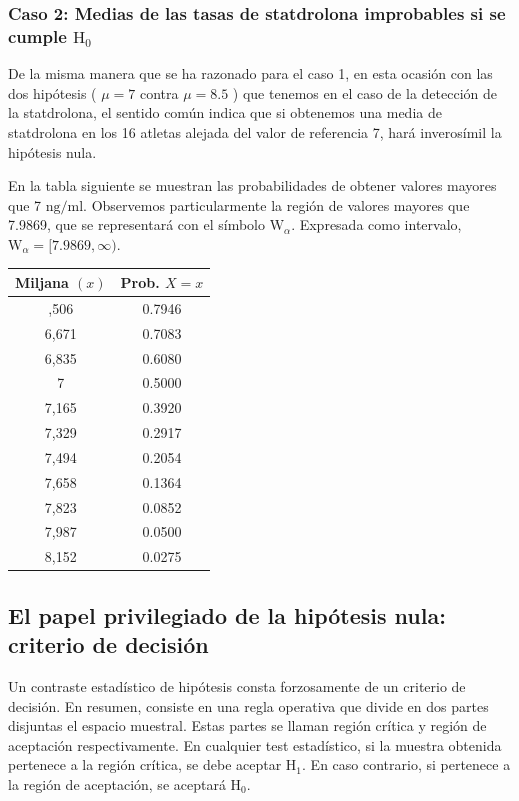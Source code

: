 \documentclass[
]{article}
\begin{document}
\subsubsection{\texorpdfstring{Caso 2: Medias de las tasas de statdrolona improbables si se cumple \(\mathrm{H}_{0}\)}{Caso 2: Medias de las tasas de statdrolona improbables si se cumple \textbackslash mathrm\{H\}\_\{0\}}}\label{caso-2-medias-de-las-tasas-de-statdrolona-improbables-si-se-cumple-mathrmh_0}

De la misma manera que se ha razonado para el caso 1, en esta ocasión con las dos hipótesis ( \(\mu=7\) contra \(\mu=8.5\) ) que tenemos en el caso de la detección de la statdrolona, el sentido común indica que si obtenemos una media de statdrolona en los 16 atletas alejada del valor de referencia 7, hará inverosímil la hipótesis nula.

En la tabla siguiente se muestran las probabilidades de obtener valores mayores que 7 \(\mathrm{ng} / \mathrm{ml}\). Observemos particularmente la región de valores mayores que 7.9869, que se representará con el símbolo \(\mathrm{W}_{\alpha}\). Expresada como intervalo, \(\mathrm{W}_{\alpha}=[7.9869, \infty)\).

\begin{longtable}[]{@{}cc@{}}
\toprule\noalign{}
Miljana \((x)\) & Prob. \(X=x\) \\
\midrule\noalign{}
\endhead
\bottomrule\noalign{}
\endlastfoot
6,506 & 0.7946 \\
6,671 & 0.7083 \\
6,835 & 0.6080 \\
7 & 0.5000 \\
7,165 & 0.3920 \\
7,329 & 0.2917 \\
7,494 & 0.2054 \\
7,658 & 0.1364 \\
7,823 & 0.0852 \\
7,987 & 0.0500 \\
8,152 & 0.0275 \\
\end{longtable}

\subsection{El papel privilegiado de la hipótesis nula: criterio de decisión}\label{el-papel-privilegiado-de-la-hipuxf3tesis-nula-criterio-de-decisiuxf3n}

Un contraste estadístico de hipótesis consta forzosamente de un criterio de decisión. En resumen, consiste en una regla operativa que divide en dos partes disjuntas el espacio muestral. Estas partes se llaman región crítica y región de aceptación respectivamente. En cualquier test estadístico, si la muestra obtenida pertenece a la región crítica, se debe aceptar \(\mathrm{H}_{1}\). En caso contrario, si pertenece a la región de aceptación, se aceptará \(\mathrm{H}_{0}\).
\end{document}
